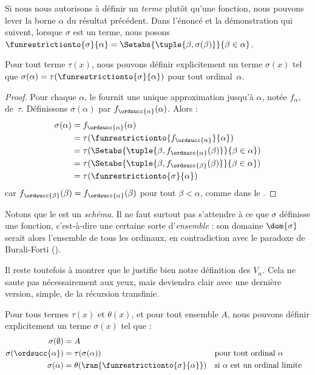 \documentclass[../../../include/open-logic-section]{subfiles}
\begin{document}
Si nous nous autorisons à définir un \emph{terme} plutôt qu'une
fonction, nous pouvons lever la borne $\alpha$ du résultat précédent.
Dans l'énoncé et la démonstration qui suivent, lorsque $\sigma$ est
un terme, nous posons
$\funrestrictionto{\sigma}{\alpha} =
\Setabs{\tuple{\beta, \sigma(\beta)}}{\beta \in \alpha}$.

\begin{thm}
Pour tout terme $\tau(x)$, nous pouvons définir explicitement un
terme $\sigma(x)$ tel que
$\sigma(\alpha) = \tau(\funrestrictionto{\sigma}{\alpha})$ pour
tout ordinal~$\alpha$.
\end{thm}

\begin{proof}
Pour chaque $\alpha$, le  fournit une unique
approximation jusqu'à $\alpha$, notée $f_\alpha$, de~$\tau$.
Définissons $\sigma(\alpha)$ par
$f_{\ordsucc{\alpha}}(\alpha)$. Alors :
\begin{align*}
	\sigma(\alpha) &=
	f_{\ordsucc{\alpha}}(\alpha) \\&=
	\tau(\funrestrictionto{f_{\ordsucc{\alpha}}}{\alpha}) \\&=
	\tau(\Setabs{\tuple{\beta, f_{\ordsucc{\alpha}}(\beta)}}{\beta \in \alpha}) \\&=
	\tau(\Setabs{\tuple{\beta, f_{\ordsucc{\beta}}(\beta)}}{\beta \in \alpha})\\&=
	\tau(\funrestrictionto{\sigma}{\alpha})
\end{align*}
car $f_{\ordsucc{\beta}}(\beta) =
f_{\ordsucc{\alpha}}(\beta)$ pour tout $\beta < \alpha$, comme
dans le .
\end{proof}
\noindent
Notons que le  est un \emph{schéma}. Il ne
faut surtout pas s'attendre à ce que $\sigma$ définisse une
fonction, c'est-à-dire une certaine sorte d'\emph{ensemble} : son
domaine $\dom{\sigma}$ serait alors l'ensemble de tous les
ordinaux, en contradiction avec le paradoxe de Burali-Forti
().

Il reste toutefois à montrer que le 
justifie bien notre définition des $V_\alpha$. Cela ne saute pas
nécessairement aux yeux, mais deviendra clair avec une dernière
version, simple, de la récursion transfinie.

\begin{thm}
Pour tous termes $\tau(x)$ et $\theta(x)$, et pour tout ensemble
$A$, nous pouvons définir explicitement un terme $\sigma(x)$ tel que :
\begin{align*}
	\sigma(\emptyset) &= A\\
	\sigma(\ordsucc{\alpha}) &= \tau(\sigma(\alpha)) &&
		\text{pour tout ordinal }\alpha\\
	\sigma(\alpha) &= \theta(\ran{\funrestrictionto{\sigma}{\alpha}})&&
	\text{si }\alpha\text{ est un ordinal limite}
\end{align*}
\end{thm}
\end{document}
